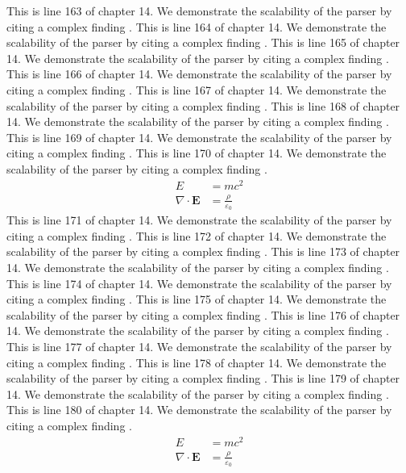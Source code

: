 This is line 163 of chapter 14. We demonstrate the scalability of the parser by citing a complex finding \cite{ref14_163}.
This is line 164 of chapter 14. We demonstrate the scalability of the parser by citing a complex finding \cite{ref14_164}.
This is line 165 of chapter 14. We demonstrate the scalability of the parser by citing a complex finding \cite{ref14_165}.
This is line 166 of chapter 14. We demonstrate the scalability of the parser by citing a complex finding \cite{ref14_166}.
This is line 167 of chapter 14. We demonstrate the scalability of the parser by citing a complex finding \cite{ref14_167}.
This is line 168 of chapter 14. We demonstrate the scalability of the parser by citing a complex finding \cite{ref14_168}.
This is line 169 of chapter 14. We demonstrate the scalability of the parser by citing a complex finding \cite{ref14_169}.
This is line 170 of chapter 14. We demonstrate the scalability of the parser by citing a complex finding \cite{ref14_170}.
\begin{align*}
  E &= mc^2 \\
  \nabla \cdot \mathbf{E} &= \frac{\rho}{\varepsilon_0}
\end{align*}
This is line 171 of chapter 14. We demonstrate the scalability of the parser by citing a complex finding \cite{ref14_171}.
This is line 172 of chapter 14. We demonstrate the scalability of the parser by citing a complex finding \cite{ref14_172}.
This is line 173 of chapter 14. We demonstrate the scalability of the parser by citing a complex finding \cite{ref14_173}.
This is line 174 of chapter 14. We demonstrate the scalability of the parser by citing a complex finding \cite{ref14_174}.
This is line 175 of chapter 14. We demonstrate the scalability of the parser by citing a complex finding \cite{ref14_175}.
This is line 176 of chapter 14. We demonstrate the scalability of the parser by citing a complex finding \cite{ref14_176}.
This is line 177 of chapter 14. We demonstrate the scalability of the parser by citing a complex finding \cite{ref14_177}.
This is line 178 of chapter 14. We demonstrate the scalability of the parser by citing a complex finding \cite{ref14_178}.
This is line 179 of chapter 14. We demonstrate the scalability of the parser by citing a complex finding \cite{ref14_179}.
This is line 180 of chapter 14. We demonstrate the scalability of the parser by citing a complex finding \cite{ref14_180}.
\begin{align*}
  E &= mc^2 \\
  \nabla \cdot \mathbf{E} &= \frac{\rho}{\varepsilon_0}
\end{align*}
